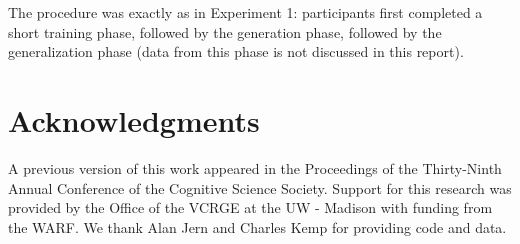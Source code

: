 \documentclass[12pt]{article}
\begin{document}
\begin{flushleft}
The procedure was exactly as in Experiment 1: participants first completed a short training phase, followed by the generation phase, followed by the generalization phase (data from this phase is not discussed in this report).







\section{Acknowledgments}
A previous version of this work appeared in the Proceedings of the Thirty-Ninth Annual Conference of the Cognitive Science Society. Support for this research was provided by the Office of the VCRGE at the UW - Madison with funding from the WARF. We thank Alan Jern and Charles Kemp for providing code and data.



\end{flushleft}


\clearpage


\clearpage
\end{document}

